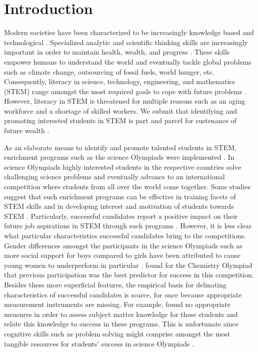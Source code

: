 \documentclass[D:/studies/WinnerS/Erhebungen/IPhO1718/paper/problem_solving/main/TaylorFrancis/interactapasample]{subfiles}
\begin{document}
\section{Introduction}

Modern societies have been characterized to be increasingly knowledge based and technological \citep{Friedman.2005}. Specialized analytic and scientific thinking skills are increasingly important in order to maintain health, wealth, and progress \citep[e.g.,][]{Pinker.2018,Flynn.2018}. These skills empower humans to understand the world and eventually tackle global problems such as climate change, outsourcing of fossil fuels, world hunger, etc. Consequently, literacy in science, technology, engineering, and mathematics (STEM) range amongst the most required goals to cope with future problems \citep{Wieman.2007,Rosling.2018}. However, literacy in STEM is threatened for multiple reasons such as an aging workforce and a shortage of skilled workers. We submit that identifying and promoting interested students in STEM is part and parcel for sustenance of future wealth \citep{PCAST.2012}.

As an elaborate means to identify and promote talented students in STEM, enrichment programs such as the science Olympiads were implemented \citep[e.g.,][]{Petersen.2017}. In science Olympiads highly interested students in the respective countries solve challenging science problems and eventually advance to an international competition where students from all over the world come together. Some studies suggest that such enrichment programs can be effective in training facets of STEM skills and in developing interest and motivation of students towards STEM \citep{Oswald.2004,Aljughaiman.2012,Wai.2010,Marsh.1995}. Particularly, successful candidates report a positive impact on their future job aspirations in STEM through such programs \citep{Feng.2001,Oswald.2004,Subotnik.1993}. However, it is less clear what particular characteristics successful candidates bring to the competitions. Gender differences amongst the participants in the science Olympiads such as more social support for boys compared to girls have been attributed to cause young women to underperform in particular \citep[e.g.,][]{Lengfelder.2002,Urhahne.2012}. \cite{Urhahne.2012} found for the Chemistry Olympiad that previous participation was the best predictor for success in this competition. Besides these more superficial features, the empirical basis for delinating characteristics of successful candidates is scarce, for once because appropriate measurement instruments are missing. For example, \cite{Urhahne.2012} found no appropriate measures in order to assess subject matter knowledge for these students and relate this knowledge to success in these programs. This is unfortunate since cognitive skills such as problem solving might comprise amongst the most tangible resources for students' success in science Olympiads \citep{Bransford.2000,Wai.2009}. 
\end{document}
